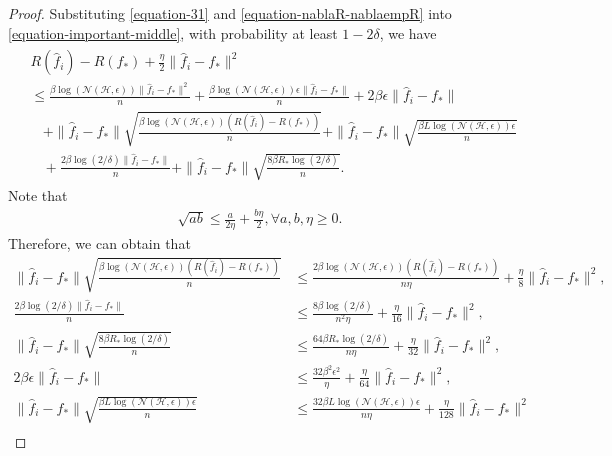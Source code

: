 \documentclass{article}
\begin{document}
\begin{proof}
  Substituting \eqref{equation-31} and \eqref{equation-nablaR-nablaempR} into \eqref{equation-important-middle},
  with probability at least $1-2\delta$, we have
  \begin{align}
    \label{equation-first-equation}
    \begin{aligned}
      &R(\hat{f}_i)-R(f_\ast)+\frac{\eta}{2}\|\hat{f}_i-f_\ast\|^2\\
      &\leq \frac{\beta \log\left(\mathcal{N}(\mathcal{H},\epsilon)\right)\|\hat{f}_i-f_\ast\|^2}{n}+
   \frac{\beta \log\left(\mathcal{N}(\mathcal{H},\epsilon)\right)\epsilon \|\hat{f}_i-f_\ast\|}{n}+2\beta\epsilon \|\hat{f}_i-f_\ast\|\\
   &~~~~+\|\hat{f}_i-f_\ast\|\sqrt{\frac{\beta \log\left(\mathcal{N}(\mathcal{H},\epsilon)\right)(R(\hat{f}_i)-R(f_\ast))}{n}}+
   \|\hat{f}_i-f_\ast\|\sqrt{\frac{\beta L \log\left(\mathcal{N}(\mathcal{H},\epsilon)\right)\epsilon}{n}}\\
   &~~~~+\frac{2\beta \log(2/\delta)\|\hat{f}_i-f_\ast\|}{n}+\|\hat{f}_i-f_\ast\|\sqrt{\frac{8\beta R_\ast \log(2/\delta)}{n}}.
    \end{aligned}
  \end{align}
  Note that
  \begin{align*}
    \sqrt{ab}\leq \frac{a}{2\eta}+\frac{b\eta}{2}, \forall a,b,\eta\geq 0.
  \end{align*}
  Therefore, we can obtain that
  \begin{align*}
    \|\hat{f}_i-f_\ast\|\sqrt{\frac{\beta \log\left(\mathcal{N}(\mathcal{H},\epsilon)\right)(R(\hat{f}_i)-R(f_\ast))}{n}}
    &\leq \frac{2\beta \log\left(\mathcal{N}(\mathcal{H},\epsilon)\right)(R(\hat{f}_i)-R(f_\ast))}{n\eta}+\frac{\eta }{8}\|\hat{f}_i-f_\ast\|^2,\\
    \frac{2\beta \log(2/\delta)\|\hat{f}_i-f_\ast\|}{n}&\leq \frac{8\beta \log(2/\delta)}{n^2\eta}+\frac{\eta }{16}\|\hat{f}_i-f_\ast\|^2,\\
    \|\hat{f}_i-f_\ast\|\sqrt{\frac{8\beta R_\ast \log(2/\delta)}{n}}&\leq \frac{64\beta R_\ast\log(2/\delta)}{n\eta}+\frac{\eta }{32}\|\hat{f}_i-f_\ast\|^2,\\
    2\beta\epsilon \|\hat{f}_i-f_\ast\|&\leq \frac{32\beta^2\epsilon^2}{\eta}+\frac{\eta }{64}\|\hat{f}_i-f_\ast\|^2,\\
    \|\hat{f}_i-f_\ast\|\sqrt{\frac{\beta L \log\left(\mathcal{N}(\mathcal{H},\epsilon)\right)\epsilon}{n}}&
    \leq \frac{32\beta L \log\left(\mathcal{N}(\mathcal{H},\epsilon)\right)\epsilon}{n\eta}+\frac{\eta }{128}\|\hat{f}_i-f_\ast\|^2\\

\end{align*}
\end{proof}
\end{document}

